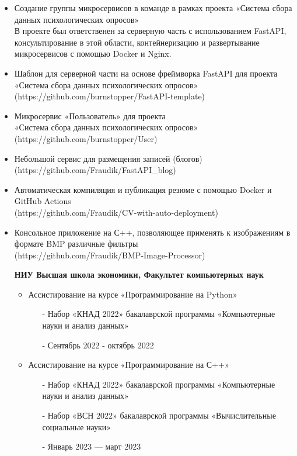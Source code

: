 \documentclass[10pt,a4paper]{altacv}
\begin{document}
\begin{itemize}
\item Создание группы микросервисов в команде в рамках проекта «Система сбора данных психологических опросов» \\
В проекте был ответственен за серверную часть с использованием FastAPI, консультирование в этой области, контейнеризацию и развертывание микросервисов с помощью Docker и Nginx. \\
\item Шаблон для серверной части на основе фреймворка FastAPI для проекта «Система сбора данных психологических опросов» \\
(https://github.com/burnstopper/FastAPI-template) \\
\item Микросервис «Пользователь» для проекта \\ «Система сбора данных психологических опросов» \\
(https://github.com/burnstopper/User) \\
\item Небольшой сервис для размещения записей (блогов)
(https://github.com/Fraudik/FastAPI\_blog) \\
\item Автоматическая компиляция и публикация резюме с помощью Docker и GitHub Actions \\
(https://github.com/Fraudik/CV-with-auto-deployment) \\
\item  Консольное приложение на С++, позволяющее применять к изображениям в формате BMP различные фильтры \\
(https://github.com/Fraudik/BMP-Image-Processor) \\
\end{itemize}

\begin{itemize}
\item[] \textbf{НИУ Высшая школа экономики, Факультет компьютерных наук}
\begin{itemize}
    \item Ассистирование на курсе «Программирование на Python»
    \begin{itemize}
        \item[-] Набор «КНАД 2022» бакалаврской программы «Компьютерные науки и анализ данных»
        \item[-] Сентябрь 2022 - октябрь 2022
    \end{itemize}
    \item Ассистирование на курсе «Программирование на С++»
    \begin{itemize}
        \item[-] Набор «КНАД 2022» бакалаврской программы «Компьютерные науки и анализ данных»
        \item[-] Набор «ВСН 2022» бакалаврской программы «Вычислительные социальные науки»
        \item[-] Январь 2023 --- март 2023
    \end{itemize}
\end{itemize}
\end{itemize}


\clearpage
\end{document}
